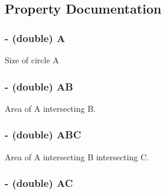 \subsection{Property Documentation}
\hypertarget{interface_t_p_chart_venn_43e8846329cf05b89731f46766c11758}{
\subsubsection[{A}]{\setlength{\rightskip}{0pt plus 5cm}- (double) A}}
\label{interface_t_p_chart_venn_43e8846329cf05b89731f46766c11758}


Size of circle A \hypertarget{interface_t_p_chart_venn_d758c3b5acdbc0477ba534b4554618bf}{
\subsubsection[{AB}]{\setlength{\rightskip}{0pt plus 5cm}- (double) AB}}
\label{interface_t_p_chart_venn_d758c3b5acdbc0477ba534b4554618bf}


Area of A intersecting B. \hypertarget{interface_t_p_chart_venn_9f204394ed012f33f04aadbec59de00b}{
\subsubsection[{ABC}]{\setlength{\rightskip}{0pt plus 5cm}- (double) ABC}}
\label{interface_t_p_chart_venn_9f204394ed012f33f04aadbec59de00b}


Area of A intersecting B intersecting C. \hypertarget{interface_t_p_chart_venn_59f24aff563decd762614e1b78e835e5}{
\subsubsection[{AC}]{\setlength{\rightskip}{0pt plus 5cm}- (double) AC}}
\label{interface_t_p_chart_venn_59f24aff563decd762614e1b78e835e5}


